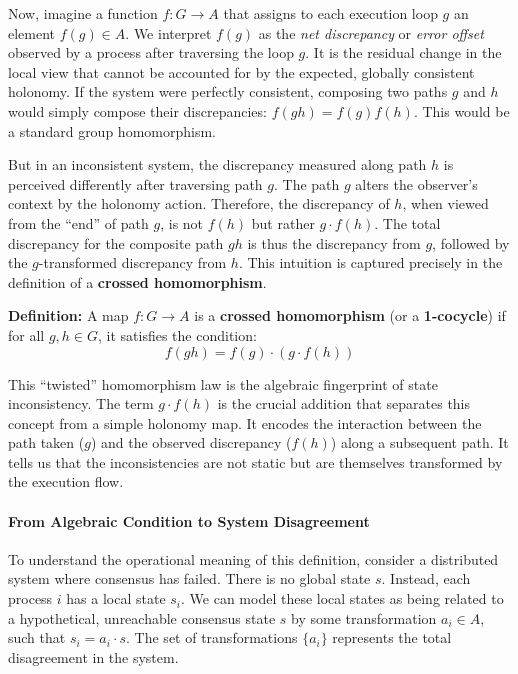 \documentclass[
]{article}
\begin{document}
Now, imagine a function \(f: G \to A\) that assigns to each execution
loop \(g\) an element \(f(g) \in A\). We interpret \(f(g)\) as the
\emph{net discrepancy} or \emph{error offset} observed by a process
after traversing the loop \(g\). It is the residual change in the local
view that cannot be accounted for by the expected, globally consistent
holonomy. If the system were perfectly consistent, composing two paths
\(g\) and \(h\) would simply compose their discrepancies:
\(f(gh) = f(g)f(h)\). This would be a standard group homomorphism.

But in an inconsistent system, the discrepancy measured along path \(h\)
is perceived differently after traversing path \(g\). The path \(g\)
alters the observer's context by the holonomy action. Therefore, the
discrepancy of \(h\), when viewed from the ``end'' of path \(g\), is not
\(f(h)\) but rather \(g \cdot f(h)\). The total discrepancy for the
composite path \(gh\) is thus the discrepancy from \(g\), followed by
the \(g\)-transformed discrepancy from \(h\). This intuition is captured
precisely in the definition of a \textbf{crossed homomorphism}.

\textbf{Definition:} A map \(f: G \to A\) is a \textbf{crossed
homomorphism} (or a \textbf{1-cocycle}) if for all \(g, h \in G\), it
satisfies the condition: \[f(gh) = f(g) \cdot (g \cdot f(h))\]

This ``twisted'' homomorphism law is the algebraic fingerprint of state
inconsistency. The term \(g \cdot f(h)\) is the crucial addition that
separates this concept from a simple holonomy map. It encodes the
interaction between the path taken (\(g\)) and the observed discrepancy
(\(f(h)\)) along a subsequent path. It tells us that the inconsistencies
are not static but are themselves transformed by the execution flow.

\paragraph{From Algebraic Condition to System
Disagreement}\label{from-algebraic-condition-to-system-disagreement}

To understand the operational meaning of this definition, consider a
distributed system where consensus has failed. There is no global state
\(s\). Instead, each process \(i\) has a local state \(s_i\). We can
model these local states as being related to a hypothetical, unreachable
consensus state \(s\) by some transformation \(a_i \in A\), such that
\(s_i = a_i \cdot s\). The set of transformations \(\{a_i\}\) represents
the total disagreement in the system.
\end{document}
